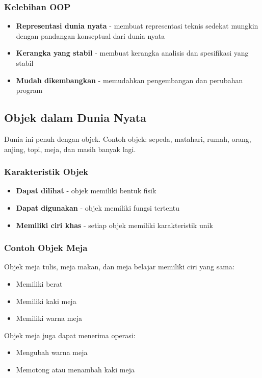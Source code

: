 \subsubsection{Kelebihan OOP}

\begin{itemize}
\item \textbf{Representasi dunia nyata} - membuat representasi teknis sedekat mungkin dengan pandangan konseptual dari dunia nyata
\item \textbf{Kerangka yang stabil} - membuat kerangka analisis dan spesifikasi yang stabil
\item \textbf{Mudah dikembangkan} - memudahkan pengembangan dan perubahan program
\end{itemize}

\subsection{Objek dalam Dunia Nyata}

Dunia ini penuh dengan objek. Contoh objek: sepeda, matahari, rumah, orang, anjing, topi, meja, dan masih banyak lagi.

\subsubsection{Karakteristik Objek}

\begin{itemize}
\item \textbf{Dapat dilihat} - objek memiliki bentuk fisik
\item \textbf{Dapat digunakan} - objek memiliki fungsi tertentu
\item \textbf{Memiliki ciri khas} - setiap objek memiliki karakteristik unik
\end{itemize}

\subsubsection{Contoh Objek Meja}

Objek meja tulis, meja makan, dan meja belajar memiliki ciri yang sama:
\begin{itemize}
\item Memiliki berat
\item Memiliki kaki meja
\item Memiliki warna meja
\end{itemize}

Objek meja juga dapat menerima operasi:
\begin{itemize}
\item Mengubah warna meja
\item Memotong atau menambah kaki meja
\end{itemize}

